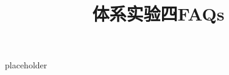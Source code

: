 \documentclass{article}
\title{\textbf{体系实验四FAQs}\vspace{-2em}}
\author{}
\date{}
\begin{document}
\maketitle

placeholder
\end{document}
